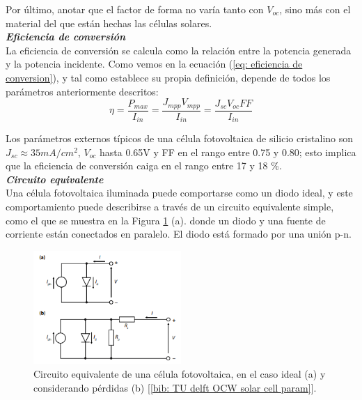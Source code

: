 \documentclass[12pt]{article}
\begin{document}
	\noindent Por último, anotar que el factor de forma no varía tanto con $V_{oc}$, sino más con el material del que están hechas las células solares. \\
	

	\noindent \textit{\textbf{Eficiencia de conversión}} \\
	
	\noindent La eficiencia de conversión se calcula como la relación entre la potencia generada y la potencia incidente.  Como vemos en la ecuación (\ref{eq: eficiencia de conversion}), y tal como establece su propia definición, depende de todos los parámetros anteriormente descritos: \\
	
	\begin{equation}
		 \eta = \frac{P_{max}}{I_{in}} = \frac{J_{mpp} V_{mpp}}{I_{in}} = \frac{J_{sc} V_{oc} FF}{I_{in}} 
		 \label{eq: eficiencia de conversion}
	\end{equation}
	
	\noindent Los parámetros externos típicos de una célula fotovoltaica de silicio cristalino son $J_{sc} \approx 35 mA/cm^2$, $V_{oc}$ hasta 0.65V y FF en el rango entre 0.75 y 0.80; esto implica que la eficiencia de conversión caiga en el rango entre 17 y 18 \%. \\
	
	\noindent \textit{\textbf{Circuito equivalente}} \\
	
	\noindent Una célula fotovoltaica iluminada puede comportarse como un diodo ideal, y este comportamiento puede describirse a través de un circuito equivalente simple, como el que se muestra en la Figura \ref{fig: equivalent circuit solar cell} (a). donde un diodo y una fuente de corriente están conectados en paralelo. El diodo está formado por una unión p-n. \\
	
	\begin{figure}[h!]
		\begin{center}
			\includegraphics[width=0.5\textwidth]{img/circuitEquivalent_solarCell.png}
			\caption{Circuito equivalente de una célula fotovoltaica, en el caso ideal (a) y considerando pérdidas (b) [\ref{bib: TU delft OCW solar cell param}].}
			\label{fig: equivalent circuit solar cell}
		\end{center}
	\end{figure}
	
\end{document}

